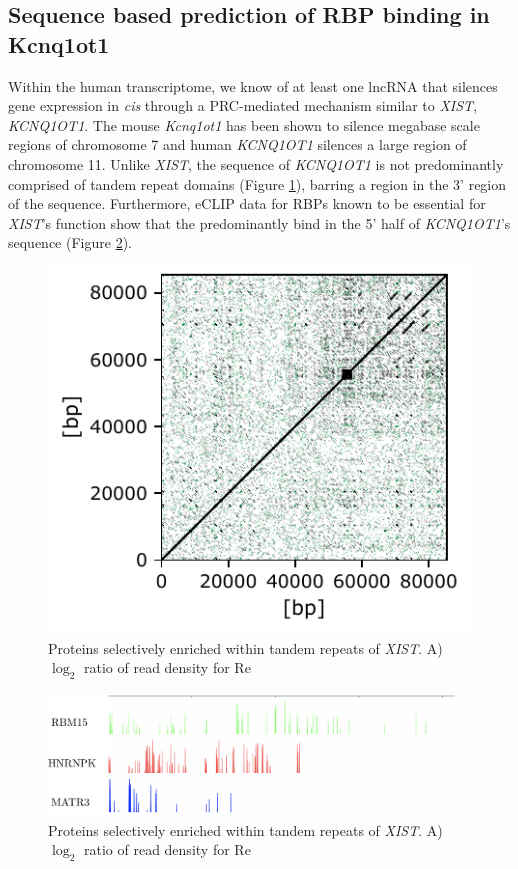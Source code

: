 \subsection{Sequence based prediction of RBP binding in Kcnq1ot1}
Within the human transcriptome, we know of at least one lncRNA that silences gene expression in \emph{cis} through a PRC-mediated mechanism similar to \emph{XIST}, \emph{KCNQ1OT1}. The mouse \emph{Kcnq1ot1} has been shown to silence megabase scale regions of chromosome 7 and human \emph{KCNQ1OT1} silences a large region of chromosome 11. Unlike \emph{XIST}, the sequence of \emph{KCNQ1OT1} is not predominantly comprised of tandem repeat domains (Figure \ref{fig:kcndot}), barring a region in the 3' region of the sequence. Furthermore, eCLIP data for RBPs known to be essential for \emph{XIST}'s function show that the predominantly bind in the 5' half of \emph{KCNQ1OT1}'s sequence (Figure \ref{fig:kcnproteins}). 

\begin{figure}[h!]
\centering
\includegraphics[width=.4\textwidth]{images/kcnd.pdf}
\caption{Proteins selectively enriched within tandem repeats of \emph{XIST}. A) $\log_2$ ratio of read density for Re}
\label{fig:kcndot}
\end{figure}

\begin{figure}[h!]
\centering
\includegraphics[width=\textwidth]{images/kcnproteins.pdf}
\caption{Proteins selectively enriched within tandem repeats of \emph{XIST}. A) $\log_2$ ratio of read density for Re}
\label{fig:kcnproteins}
\end{figure}

